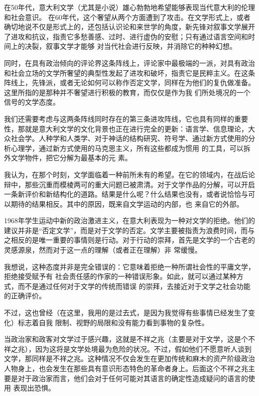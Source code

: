 \documentclass{article}
\begin{document}
在50年代，意大利文学（尤其是小说）雄心勃勃地希望能够表现当代意大利的伦理和社会意识。
\newpage
在60年代，这个奢望从两个方面遭到了攻击。在文学形式上，或者确切地说不仅是形式上的，还包括认识论和来世学的角度，新先锋对叙事文学展开了进攻和抗议，指责它多愁善感、过时、进行虚伪的安慰；只有通过语言空间和时间上的决裂，叙事文学才能够
对当代社会进行反映，并消除它的种种幻想。 

同时，在具有政治倾向的评论界这条阵线上，评论家中最极端的一派，对具有政治和社会立场的文学所奢望的典型性发起了进攻和破坏，指责它是民粹主义。在这条阵线上，先锋派，或者无论如何可以称作否定文学，同样在为他们的复仇做准备。这里所指的是那种并不奢望进行积极的教育，而仅仅是作为我
们所处境况的一个信号的文学态度。 

我们还需要考虑与这两条阵线同时存在的第三条进攻阵线，它也具有同样的重要性，那就是意大利文学的文化背景也正在进行完全的更新：语言学、信息理论，大众社会学。人种学和人类学、对于神话的结构研究、符号学、通过新方式使用的分析心理学，通过新方式使用的马克思主义，所有这些都成为惯用
\newpage
的工具，可以拆外文学物件，把它分解为最基本的元
素。 

我认为，在那个时刻，文学面临着一种前所未有的希望。在它的领域内，在战后论辩中，那些沉重而模棱两可的重大问题已被肃清。对于文学作品的分解，可以开启一条新评价和新结构化的道路。结果是什么呢？什么结果也没有，或者说恰恰与可以期待的结果相反。其中的原因，既来自文学运动的内部，也
来自它的外部。 

1968年学生运动中新的政治激进主义，在意大利表现为一种对文学的拒绝。他们的建议并非是“否定文学”，而是对于文学的否定。文学主要被指责为浪费时间，而与之相反的是唯一重要的事情则是行动。对于行动的崇拜，首先是文学的一个古老的灵感源泉，然而对于这一点的理解（或者正在理解）非
常缓慢。 

我想说，这种态度并非是完全错误的：它意味着拒绝一种所谓社会性的平庸文学，拒绝接受赋予有
\newpage
社会责任感的作家的一种错误形象。如此，就可以通过某种方式，而不是通过任何对于文学的传统而错误
的崇拜，去接近对于文学之社会功能的正确评价。 

不过，这也曾经（在这里，我用的是过去式，是因为我觉得有些事情已经发生了变化）标志着自我
限制、视野的局限和没有能力看到事物的复杂性。 

当政治家和政客对文学过于感兴趣，这就是不祥之兆（主要是对于文学，这是个不祥之兆），因为这将是文学处境最为危险的状况。不过，假如他们不愿意听人谈到文学，那同样是不祥之兆。这种情况不仅会发生在更加传统和麻木的资产阶级政治人物身上，也会发生在那些具有意识形态特色的革命者身上。后面这个不祥之兆主要是对于政治家而言，他们会对于任何可能对其语言的确定性造成疑问的语言的使用
表现出恐惧。 
\end{document}
